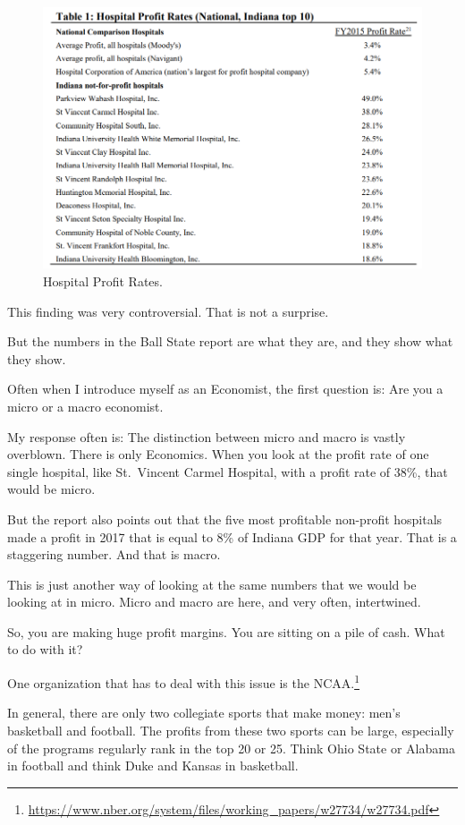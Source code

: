 \documentclass[
]{book}
\begin{document}
\begin{figure}

{\centering \includegraphics[width=0.75\linewidth]{img/monopoly/fig4} 

}

\caption{Hospital Profit Rates.}\label{fig:monopoly04}
\end{figure}

This finding was very controversial. That is not a surprise.

But the numbers in the Ball State report are what they are, and they show what they show.

Often when I introduce myself as an Economist, the first question is: Are you a micro or a macro economist.

My response often is: The distinction between micro and macro is vastly overblown. There is only Economics.
When you look at the profit rate of one single hospital, like St.~Vincent Carmel Hospital, with a profit rate of 38\%, that would be micro.

But the report also points out that the five most profitable non-profit hospitals made a profit in 2017 that is equal to 8\% of Indiana GDP for that year. That is a staggering number. And that is macro.

This is just another way of looking at the same numbers that we would be looking at in micro. Micro and macro are here, and very often, intertwined.

So, you are making huge profit margins. You are sitting on a pile of cash. What to do with it?

One organization that has to deal with this issue is the NCAA.\footnote{\url{https://www.nber.org/system/files/working_papers/w27734/w27734.pdf}}

In general, there are only two collegiate sports that make money: men's basketball and football. The profits from these two sports can be large, especially of the programs regularly rank in the top 20 or 25. Think Ohio State or Alabama in football and think Duke and Kansas in basketball.
\end{document}
